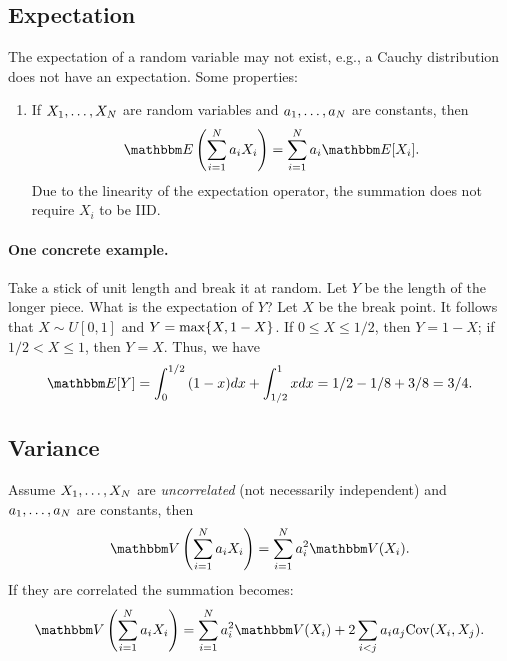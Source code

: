 \subsection{Expectation}
    The expectation of a random variable may not exist, e.g., a Cauchy distribution does not have an expectation. 
    Some properties:
        \begin{enumerate}
            \item If $X_1, \ldots, X_N$ are random variables and $a_1, \ldots, a_N$ are constants, then
                \begin{equation}
                    \E\left( \sum_{i=1}^{\ndata}{a_i X_i}\right) = \sum_{i=1}^{\ndata}{a_i \E[X_i]}.
                \end{equation}
            Due to the linearity of the expectation operator, the summation does not require $X_i$ to be IID.
        \end{enumerate}
    \paragraph{One concrete example.} Take a stick of unit length and break it at random.
    Let $Y$ be the length of the longer piece. 
    What is the expectation of $Y$?
    Let $X$ be the break point.
    It follows that $X \sim U[0, 1]$ and $Y = \max\{ X, 1- X \}$.
    If $0 \le X \le 1/2$, then $Y = 1 - X$; if $1/2 < X \le 1$, then $Y = X$.
    Thus, we have
        \begin{equation}
            \E{[Y]} = \int_{0}^{1/2}{(1-x) dx} + \int_{1/2}^{1}{x dx} = 1/2 - 1/8 + 3/8 = 3/4.
        \end{equation}
        
\subsection{Variance}
    Assume $X_1, \ldots, X_N$ are \emph{uncorrelated} (not necessarily independent) and $a_1, \ldots, a_N$ are constants, then
        \begin{equation}
            \Var\left( \sum_{i=1}^{\ndata}{a_i X_i} \right) = \sum_{i=1}^{\ndata}{a_i^2 \Var(X_i)}.
        \end{equation}
    If they are correlated the summation becomes:
        \begin{equation}
            \Var\left( \sum_{i=1}^{\ndata}{a_i X_i}\right) = \sum_{i=1}^{\ndata}{a_i^2 \Var(X_i)} + 2 \sum_{i < j}^{}{a_i a_j \Cov(X_i, X_j)}.
        \end{equation}


